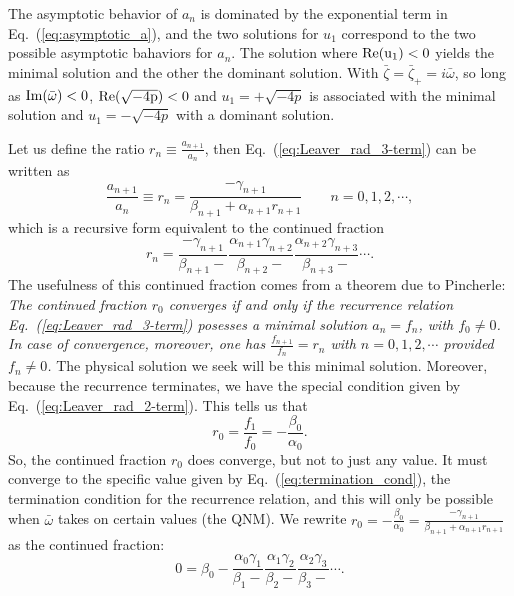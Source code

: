 \documentclass[11pt]{article}
\begin{document}
The asymptotic behavior of $a_n$ is dominated by the exponential term
in Eq.~(\ref{eq:asymptotic_a}), and the two solutions for $u_1$
correspond to the two possible asymptotic bahaviors for $a_n$.  The
solution where $\rm{Re}(u_1)<0$ yields the minimal solution and the
other the dominant solution.  With
$\bar\zeta=\bar\zeta_+=i\bar\omega$, so long as
$\rm{Im}(\bar\omega)<0$, $\rm{Re}(\sqrt{-4p})<0$ and $u_1=+\sqrt{-4p}$
is associated with the minimal solution and $u_1=-\sqrt{-4p}$ with a
dominant solution.

Let us define the ratio $r_n\equiv\frac{a_{n+1}}{a_n}$, then
Eq.~(\ref{eq:Leaver_rad_3-term}) can be written as
\begin{equation}
  \frac{a_{n+1}}{a_n} \equiv r_n 
  = \frac{-\gamma_{n+1}}{\beta_{n+1}+ \alpha_{n+1}r_{n+1}}
  \qquad n=0,1,2,\cdots,
\end{equation}
which is a recursive form equivalent to the continued fraction
\begin{equation}\label{eq:Leaver_rad_CF_dom}
r_n 
  = \frac{-\gamma_{n+1}}{\beta_{n+1}-} 
    \frac{\alpha_{n+1}\gamma_{n+2}}{\beta_{n+2}-}
    \frac{\alpha_{n+2}\gamma_{n+3}}{\beta_{n+3}-}\cdots.
\end{equation}
The usefulness of this continued fraction comes from a theorem due to
Pincherle:
 \\ {\em The continued fraction $r_0$ converges if and only
  if the recurrence relation Eq.~(\ref{eq:Leaver_rad_3-term}) posesses
  a minimal solution $a_n=f_n$, with $f_0\ne0$.  In case of
  convergence, moreover, one has $\frac{f_{n+1}}{f_n}=r_n$ with
  $n=0,1,2,\cdots$ provided $f_n\ne0$.}  The physical solution we seek
will be this minimal solution.  Moreover, because the recurrence
terminates, we have the special condition given by
Eq.~(\ref{eq:Leaver_rad_2-term}).  This tells us that
\begin{equation}\label{eq:termination_cond}
  r_0=\frac{f_1}{f_0}=-\frac{\beta_0}{\alpha_0}.
\end{equation}
So, the continued fraction $r_0$ does converge, but not to just any
value.  It must converge to the specific value given by
Eq.~(\ref{eq:termination_cond}), the termination condition for the
recurrence relation, and this will only be possible when $\bar\omega$
takes on certain values (the QNM).  We rewrite
$r_0=-\frac{\beta_0}{\alpha_0}=\frac{-\gamma_{n+1}}{\beta_{n+1}+
  \alpha_{n+1}r_{n+1}}$ as the continued fraction:
\begin{equation}\label{eq:Leaver_Cf_inf}
  0=\beta_0 -\frac{\alpha_0\gamma_1}{\beta_1-}
             \frac{\alpha_1\gamma_2}{\beta_2-}
             \frac{\alpha_2\gamma_3}{\beta_3-}\cdots.
\end{equation}
\end{document}

